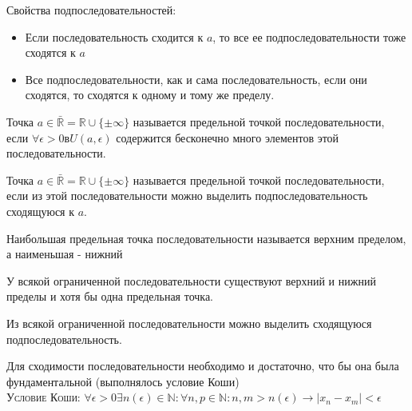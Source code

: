 \documentclass[14pt]{extreport}
\begin{document}
            Свойства подпоследовательностей:
            \begin{itemize}
                \item Если последовательность сходится к $a$, то все ее подпоследовательности тоже сходятся к $a$
                \item Все подпоследовательности, как и сама последовательность, если они сходятся, то сходятся к одному и тому же пределу.
            \end{itemize}


            \begin{definition}
                Точка $a \in \bar{\mathbb{R}} = \mathbb{R} \cup \{\pm \infty\}$ называется предельной точкой последовательности, если $\forall \epsilon > 0 в U(a, \epsilon)$ содержится бесконечно много элементов этой последовательности. 
            \end{definition}

            \begin{definition}
                Точка $a \in \bar{\mathbb{R}} = \mathbb{R} \cup \{\pm \infty\}$ называется предельной точкой последовательности, если из этой последовательности можно выделить подпоследовательность сходящуюся к $a$.
            \end{definition}

            \begin{definition}
                Наибольшая предельная точка последовательности называется верхним пределом, а наименьшая - нижний
            \end{definition}

            \begin{theorem}
                У всякой ограниченной последовательности существуют верхний и нижний пределы и хотя бы одна предельная точка.
            \end{theorem}

            \begin{theorem}
                Из всякой ограниченной последовательности можно выделить сходящуюся подпоследовательность.
            \end{theorem}

            \begin{theorem}
                Для сходимости последовательности необходимо и достаточно, что бы она была фундаментальной (выполнялось условие Коши) \\
                \textsc{Условие Коши:} $\forall \epsilon > 0 \exists n(\epsilon) \in \mathbb{N} : \forall n,p \in \mathbb{N}: n, m > n(\epsilon) \rightarrow |x_n - x_m| < \epsilon$
            \end{theorem}
\end{document}
